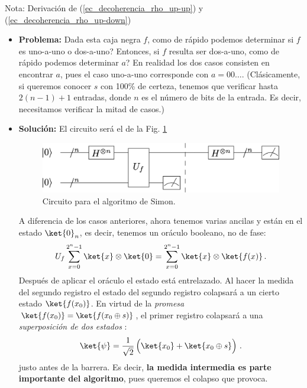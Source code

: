 \documentclass[a4paper,11pt]{book} %
\numberwithin{equation}{chapter}
\begin{document}
\begin{mybox_blue}{Nota: Derivación de (\ref{ec_decoherencia_rho_up-up}) y  (\ref{ec_decoherencia_rho_up-down})}
\begin{itemize}
	\item \textbf{Problema:} Dada esta caja negra $f$, como de rápido podemos determinar si $f$ es uno-a-uno o dos-a-uno? Entonces, si $f$ resulta ser dos-a-uno, como de rápido podemos determinar $a$? En realidad los dos casos consisten en encontrar $a$, pues el caso uno-a-uno corresponde con $a=00\dots$. (Clásicamente, si queremos conocer $s$ con 100\% de certeza, tenemos que verificar hasta $2(n-1) +1$ entradas, donde $n$ es el número de bits de la entrada. Es decir, necesitamos verificar la mitad de casos.)
		
	\item \textbf{Solución:} El circuito será el de la Fig. \ref{Fig_algoritmos_SimonCircuit}
	
		\begin{figure}[H]
			\centering 
			\includegraphics[width=0.6\linewidth]{Figuras/Fig_algoritmos_SimonCircuit.png}
			\caption{Circuito para el algoritmo de Simon.}
			\label{Fig_algoritmos_SimonCircuit}
			\end{figure}	
	
	A diferencia de los casos anteriores, ahora tenemos varias ancilas y están en el estado $\ket{0}_n$, es decir, tenemos un oráculo booleano, no de fase:
	$$
	U_f \sum_{x=0}^{2^n-1}\ket{x}\otimes \ket{0}  = \sum_{x=0}^{2^n-1}\ket{x}\otimes \ket{f(x)} \,.
	$$
	Después de aplicar el oráculo el estado está entrelazado. Al hacer la medida del segundo registro  el estado del segundo registro colapsará a un cierto estado $\ket{f(x_0)}$. En virtud de la \textit{promesa }$\ket{f(x_0)} = \ket{f(x_0\oplus s)}$, el primer registro colapsará a una \textit{superposición de dos estados} :
	$$
	\ket{\psi} = \frac{1}{\sqrt{2}} \left( \rule{0mm}{4mm} \ket{x_0} + \ket{x_0 \oplus s} \right) \,.
	$$
	justo antes de la barrera. Es decir, \textbf{la medida intermedia es parte importante del algoritmo}, pues queremos el colapso que provoca. 
	

\end{itemize}
\end{mybox_blue}
\end{document}
